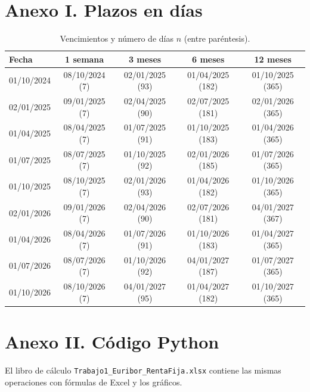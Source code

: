 \documentclass[a4paper,12pt]{article}
\begin{document}
\section*{Anexo I. Plazos en días}
\begin{table}[H]\centering\caption{Vencimientos y número de días $n$ (entre paréntesis).}\label{tab:dias}\footnotesize
\begin{tabular}{lcccc}\toprule Fecha & 1 semana & 3 meses & 6 meses & 12 meses\\\midrule
01/10/2024 & 08/10/2024 (7) & 02/01/2025 (93) & 01/04/2025 (182) & 01/10/2025 (365) \\
02/01/2025 & 09/01/2025 (7) & 02/04/2025 (90) & 02/07/2025 (181) & 02/01/2026 (365) \\
01/04/2025 & 08/04/2025 (7) & 01/07/2025 (91) & 01/10/2025 (183) & 01/04/2026 (365) \\
01/07/2025 & 08/07/2025 (7) & 01/10/2025 (92) & 02/01/2026 (185) & 01/07/2026 (365) \\
01/10/2025 & 08/10/2025 (7) & 02/01/2026 (93) & 01/04/2026 (182) & 01/10/2026 (365) \\
02/01/2026 & 09/01/2026 (7) & 02/04/2026 (90) & 02/07/2026 (181) & 04/01/2027 (367) \\
01/04/2026 & 08/04/2026 (7) & 01/07/2026 (91) & 01/10/2026 (183) & 01/04/2027 (365) \\
01/07/2026 & 08/07/2026 (7) & 01/10/2026 (92) & 04/01/2027 (187) & 01/07/2027 (365) \\
01/10/2026 & 08/10/2026 (7) & 04/01/2027 (95) & 01/04/2027 (182) & 01/10/2027 (365) \\
\bottomrule\end{tabular}\end{table}

\section*{Anexo II. Código Python}
El libro de cálculo \texttt{Trabajo1\_Euribor\_RentaFija.xlsx} contiene las mismas operaciones con fórmulas de Excel y los gráficos.

\end{document}
